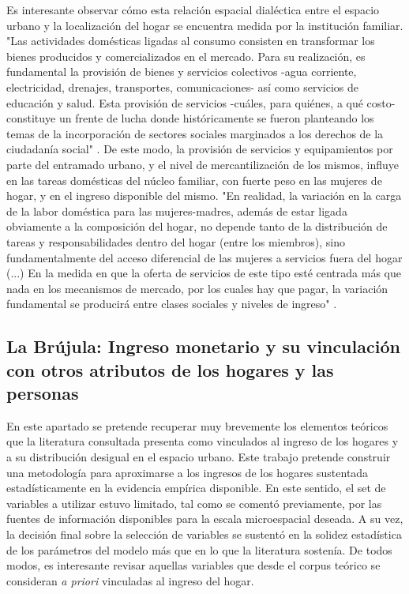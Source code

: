 Es interesante observar cómo esta relación espacial dialéctica entre el espacio urbano y la localización del hogar se encuentra medida por la institución familiar. "Las actividades domésticas ligadas al consumo consisten en transformar los bienes producidos y comercializados en el mercado. Para su realización, es fundamental la provisión de bienes y servicios colectivos -agua corriente, electricidad, drenajes, transportes, comunicaciones- así como servicios de educación y salud. Esta provisión de servicios -cuáles, para quiénes, a qué costo- constituye un frente de lucha donde históricamente se fueron planteando los temas de la incorporación de sectores sociales marginados a los derechos de la ciudadanía social" \cite[~91]{jelin}. De este modo, la provisión de servicios y equipamientos por parte del entramado urbano, y el nivel de mercantilización de los mismos, influye en las tareas domésticas del núcleo familiar, con fuerte peso en las mujeres de hogar, y en el ingreso disponible del mismo. "En realidad, la variación en la carga de la labor doméstica para las mujeres-madres, además de estar ligada obviamente a la composición del hogar, no depende tanto de la distribución de tareas y responsabilidades dentro del hogar (entre los miembros), sino fundamentalmente del acceso diferencial de las mujeres a servicios fuera del hogar (...) En la medida en que la oferta de servicios de este tipo esté centrada más que nada en los mecanismos de mercado, por los cuales hay que pagar, la variación fundamental se producirá entre clases sociales y niveles de ingreso" \cite[~97]{jelin}.


	
\subsection{La Brújula: Ingreso monetario y su vinculación con otros atributos de los hogares y las personas}
	
En este apartado se pretende recuperar muy brevemente los elementos teóricos que la literatura consultada presenta como vinculados al ingreso de los hogares y a su distribución desigual en el espacio urbano. Este trabajo pretende construir una metodología para aproximarse a los ingresos de los hogares sustentada estadísticamente en la evidencia empírica disponible. En este sentido, el set de variables a utilizar estuvo limitado, tal como se comentó previamente, por las fuentes de información disponibles para la escala microespacial deseada. A su vez, la decisión final sobre la selección de variables se sustentó en la solidez estadística de los parámetros del modelo más que en lo que la literatura sostenía. De todos modos, es interesante revisar aquellas variables que desde el corpus teórico se consideran \textit{a priori} vinculadas al ingreso del hogar. 


